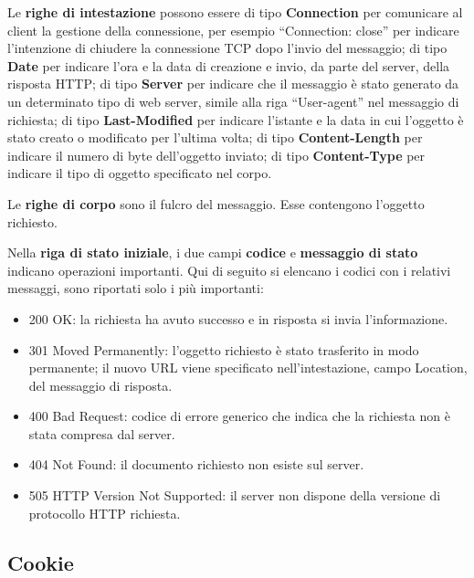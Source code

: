 \documentclass[a4paper]{article}
\begin{document}
	\noindent
	Le \textbf{righe di intestazione} possono essere di tipo \textbf{Connection} per comunicare al client la gestione della connessione, per esempio “Connection: close” per indicare l’intenzione di chiudere la connessione TCP dopo l’invio del messaggio; di tipo \textbf{Date} per indicare l’ora e la data di creazione e invio, da parte del server, della risposta HTTP; di tipo \textbf{Server} per indicare che il messaggio è stato generato da un determinato tipo di web server, simile alla riga “User-agent” nel messaggio di richiesta; di tipo \textbf{Last-Modified} per indicare l’istante e la data in cui l’oggetto è stato creato o modificato per l’ultima volta; di tipo \textbf{Content-Length} per indicare il numero di byte dell’oggetto inviato; di tipo \textbf{Content-Type} per indicare il tipo di oggetto specificato nel corpo.\newline
	
	\noindent
	Le \textbf{righe di corpo} sono il fulcro del messaggio. Esse contengono l’oggetto richiesto.\newline
	
	\noindent
	Nella \textbf{riga di stato iniziale}, i due campi \textbf{codice} e \textbf{messaggio di stato} indicano operazioni importanti. Qui di seguito si elencano i codici con i relativi messaggi, sono riportati solo i più importanti:
	
	\begin{itemize}
		\item 200 OK: la richiesta ha avuto successo e in risposta si invia l'informazione.
		
		\item 301 Moved Permanently: l’oggetto richiesto è stato trasferito in modo permanente; il nuovo URL viene specificato nell’intestazione, campo Location, del messaggio di risposta.
		
		\item 400 Bad Request: codice di errore generico che indica che la richiesta non è stata compresa dal server.
		
		\item 404 Not Found: il documento richiesto non esiste sul server.
		
		\item 505 HTTP Version Not Supported: il server non dispone della versione di protocollo HTTP richiesta.
	\end{itemize}

	\newpage
	
	\subsection{Cookie}
	
\end{document}
